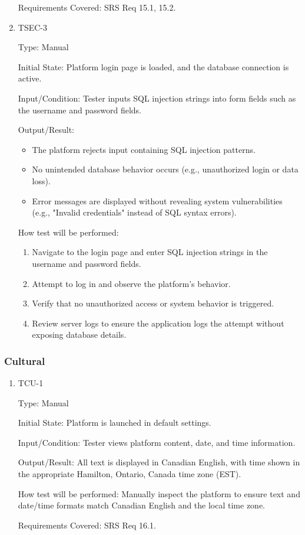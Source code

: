 \documentclass[12pt, titlepage]{article}
\begin{document}
\begin{enumerate}
Requirements Covered: SRS Req 15.1, 15.2.

\item{TSEC-3\\}

Type: Manual

Initial State: Platform login page is loaded, and the database connection is active.

Input/Condition: Tester inputs SQL injection strings into form fields such as the username and password fields.

Output/Result:

\begin{itemize}
    \item{The platform rejects input containing SQL injection patterns.} 
    \item{No unintended database behavior occurs (e.g., unauthorized login or data loss).} 
    \item{Error messages are displayed without revealing system vulnerabilities (e.g., "Invalid credentials" instead of SQL syntax errors).} 
\end{itemize}

How test will be performed: 
\begin{enumerate} 
    \item{Navigate to the login page and enter SQL injection strings in the username and password fields.} 
    \item{Attempt to log in and observe the platform's behavior.} 
    \item{Verify that no unauthorized access or system behavior is triggered.} 
    \item{Review server logs to ensure the application logs the attempt without exposing database details.} 
\end{enumerate}

\end{enumerate}

\subsubsection{Cultural}

\begin{enumerate}

\item{TCU-1\\}

Type: Manual
					
Initial State: Platform is launched in default settings.
					
Input/Condition: Tester views platform content, date, and time information.
					
Output/Result: All text is displayed in Canadian English, with time shown in the appropriate Hamilton, Ontario, Canada time zone (EST).
					
How test will be performed: Manually inspect the platform to ensure text and date/time formats match Canadian English and the local time zone.

Requirements Covered: SRS Req 16.1.

\end{enumerate}
\end{document}
